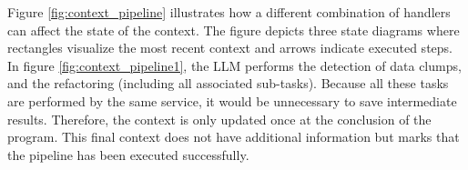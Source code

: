 Figure \ref{fig:context_pipeline} illustrates how a different combination of handlers can affect the state of the context. The figure depicts three state diagrams where rectangles visualize the most recent context and arrows indicate executed steps.  In figure \ref{fig:context_pipeline1}, the \ac{LLM} performs the detection of data clumps, and the refactoring (including all associated sub-tasks). Because all these tasks are performed by the same service, it would be unnecessary to save intermediate results. Therefore, the context is only updated once at the conclusion of the program. This final context does not have additional information but marks that the pipeline has been executed successfully.
 

\begin{figure}[H]
\centering
  \begin{adjustbox}{minipage=\linewidth,scale=0.7}
     \centering
     \begin{subfigure}[b]{0.3\textwidth}
         \centering

\end{subfigure}
\end{adjustbox}
\end{figure}
